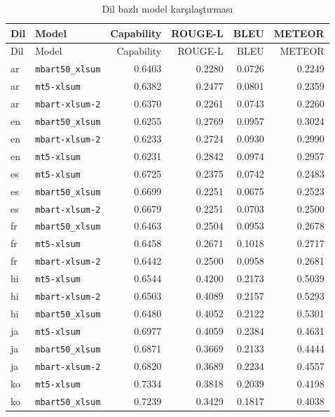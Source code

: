 \documentclass[12pt,a4paper]{article}
\begin{document}
\begin{longtable}{llrrrr}
\caption{Dil bazlı model karşılaştırması}
\label{tab:language-comparison}\\
\toprule
Dil & Model & Capability & ROUGE-L & BLEU & METEOR \\
\midrule
\endfirsthead
\toprule
Dil & Model & Capability & ROUGE-L & BLEU & METEOR \\
\midrule
\endhead
ar & \texttt{mbart50\_xlsum} & 0.6403 & 0.2280 & 0.0726 & 0.2249 \\
ar & \texttt{mt5-xlsum} & 0.6382 & 0.2477 & 0.0801 & 0.2359 \\
ar & \texttt{mbart-xlsum-2} & 0.6370 & 0.2261 & 0.0743 & 0.2260 \\
\midrule
en & \texttt{mbart50\_xlsum} & 0.6255 & 0.2769 & 0.0957 & 0.3024 \\
en & \texttt{mbart-xlsum-2} & 0.6233 & 0.2724 & 0.0930 & 0.2990 \\
en & \texttt{mt5-xlsum} & 0.6231 & 0.2842 & 0.0974 & 0.2957 \\
\midrule
es & \texttt{mt5-xlsum} & 0.6725 & 0.2375 & 0.0742 & 0.2483 \\
es & \texttt{mbart50\_xlsum} & 0.6699 & 0.2251 & 0.0675 & 0.2523 \\
es & \texttt{mbart-xlsum-2} & 0.6679 & 0.2251 & 0.0703 & 0.2500 \\
\midrule
fr & \texttt{mbart50\_xlsum} & 0.6463 & 0.2504 & 0.0953 & 0.2678 \\
fr & \texttt{mt5-xlsum} & 0.6458 & 0.2671 & 0.1018 & 0.2717 \\
fr & \texttt{mbart-xlsum-2} & 0.6442 & 0.2500 & 0.0958 & 0.2681 \\
\midrule
hi & \texttt{mt5-xlsum} & 0.6544 & 0.4200 & 0.2173 & 0.5039 \\
hi & \texttt{mbart-xlsum-2} & 0.6503 & 0.4089 & 0.2157 & 0.5293 \\
hi & \texttt{mbart50\_xlsum} & 0.6480 & 0.4052 & 0.2122 & 0.5301 \\
\midrule
ja & \texttt{mt5-xlsum} & 0.6977 & 0.4059 & 0.2384 & 0.4631 \\
ja & \texttt{mbart50\_xlsum} & 0.6871 & 0.3669 & 0.2133 & 0.4444 \\
ja & \texttt{mbart-xlsum-2} & 0.6820 & 0.3689 & 0.2234 & 0.4557 \\
\midrule
ko & \texttt{mt5-xlsum} & 0.7334 & 0.3818 & 0.2039 & 0.4198 \\
ko & \texttt{mbart50\_xlsum} & 0.7239 & 0.3429 & 0.1817 & 0.4038 \\

\end{longtable}
\end{document}
